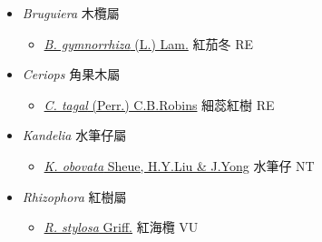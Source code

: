 
  \begin{itemize}
 \item[] \textit{Bruguiera} 木欖屬
                    
  \begin{itemize}
        \item[] \href{http://www.theplantlist.org/tpl1.1/search?q=Bruguiera+gymnorrhiza}{\textit{B. gymnorrhiza} (L.) Lam.}   紅茄冬 RE
  \end{itemize}
 \item[] \textit{Ceriops} 角果木屬
                    
  \begin{itemize}
        \item[] \href{http://www.theplantlist.org/tpl1.1/search?q=Ceriops+tagal}{\textit{C. tagal} (Perr.) C.B.Robins}   細蕊紅樹 RE
  \end{itemize}
 \item[] \textit{Kandelia} 水筆仔屬
                    
  \begin{itemize}
        \item[] \href{http://www.theplantlist.org/tpl1.1/search?q=Kandelia+obovata}{\textit{K. obovata} Sheue, H.Y.Liu \& J.Yong}   水筆仔 NT
  \end{itemize}
 \item[] \textit{Rhizophora} 紅樹屬
                    
  \begin{itemize}
        \item[] \href{http://www.theplantlist.org/tpl1.1/search?q=Rhizophora+stylosa}{\textit{R. stylosa} Griff.}   紅海欖 VU
  \end{itemize}
  \end{itemize}
